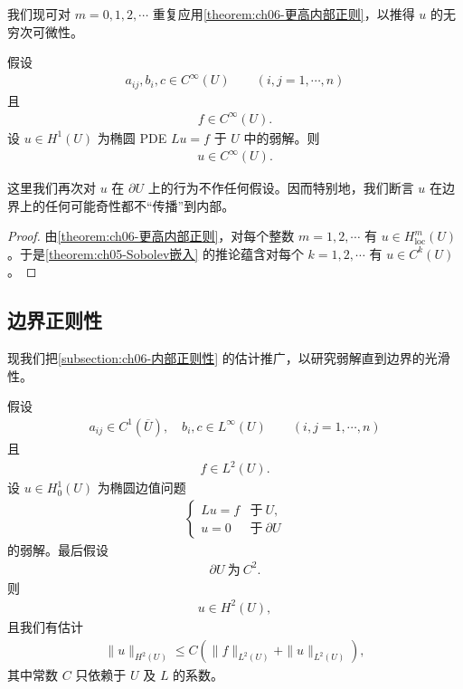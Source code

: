 \documentclass[../../main.tex]{subfiles}
\begin{document}
我们现可对 $m=0,1,2,\cdots$ 重复应用\cref{theorem:ch06-更高内部正则}，以推得 $u$ 的无穷次可微性。

\begin{theorem}[内部无穷可微性]\label{theorem:ch06-内部无穷可微}假设
\begin{align*}
a_{ij},b_{i},c\in C^{\infty}(U)\qquad (i,j=1,\cdots,n)
\end{align*}
且
\begin{align*}
f\in C^{\infty}(U).
\end{align*}
设 $u\in H^{1}(U)$ 为椭圆 PDE $Lu=f$ 于 $U$ 中的弱解。则
\begin{align*}
u\in C^{\infty}(U).
\end{align*}
\end{theorem}

这里我们再次对 $u$ 在 $\partial U$ 上的行为不作任何假设。因而特别地，我们断言 $u$ 在边界上的任何可能奇性都不“传播”到内部。

\begin{proof}
由\cref{theorem:ch06-更高内部正则}，对每个整数 $m=1,2,\cdots$ 有 $u\in H^{m}_{\mathrm{loc}}(U)$。于是\cref{theorem:ch05-Sobolev嵌入} 的推论蕴含对每个 $k=1,2,\cdots$ 有 $u\in C^{k}(U)$。
\end{proof}

\subsection{边界正则性}\label{subsection:ch06-边界正则性}

现我们把\cref{subsection:ch06-内部正则性} 的估计推广，以研究弱解直到边界的光滑性。

\begin{theorem}[边界 $H^{2}$ 正则性]\label{theorem:ch06-边界H2正则}假设
\begin{align}
a_{ij}\in C^{1}(\overline{U}),\quad b_{i},c\in L^{\infty}(U)\qquad (i,j=1,\cdots,n)
\end{align}
且
\begin{align}
f\in L^{2}(U).
\end{align}
设 $u\in H^{1}_{0}(U)$ 为椭圆边值问题
\begin{align}
\begin{cases}
Lu=f & \text{于}\ U,\\
u=0 & \text{于}\ \partial U
\end{cases}
\end{align}
的弱解。最后假设
\begin{align}
\partial U\ \text{为}\ C^{2}.
\end{align}
则
\begin{align*}
u\in H^{2}(U),
\end{align*}
且我们有估计
\begin{align}
\|u\|_{H^{2}(U)}\leqslant C(\|f\|_{L^{2}(U)}+\|u\|_{L^{2}(U)}),
\end{align}
其中常数 $C$ 只依赖于 $U$ 及 $L$ 的系数。
\end{theorem}
\end{document}
